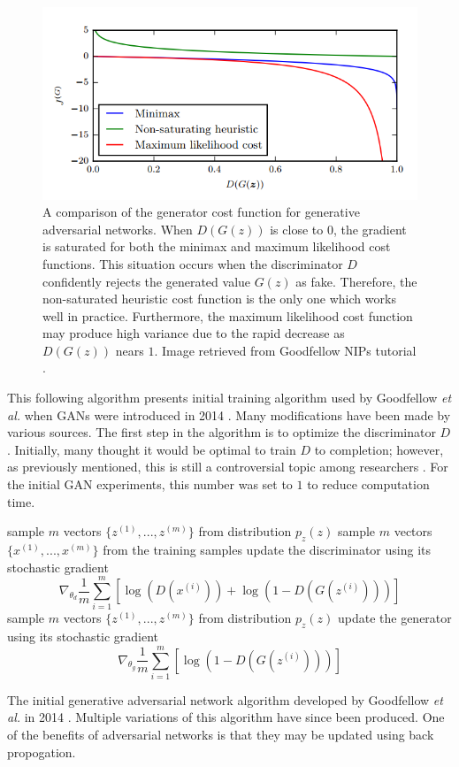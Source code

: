 \documentclass[11pt]{article}
\begin{document}
\begin{figure}
\centering
\includegraphics[scale=0.5]{costfunc}
\caption{A comparison of the generator cost function for generative adversarial networks. When $D(G(z))$ is close to $0$, the gradient is saturated for both the minimax and maximum likelihood cost functions. This situation occurs when the discriminator $D$ confidently rejects the generated value $G(z)$ as fake. Therefore, the non-saturated heuristic cost function is the only one which works well in practice. Furthermore, the maximum likelihood cost function may produce high variance due to the rapid decrease as $D(G(z))$ nears $1$. Image retrieved from Goodfellow NIPs tutorial \citep{2017arXiv170100160G}.}
\label{fig:CostFunc}
\end{figure}

This following algorithm presents initial training algorithm used by Goodfellow \textit{et al.} when GANs were introduced in 2014 \citep{2014arXiv1406.2661G}. Many modifications have been made by various sources. The first step in the algorithm is to optimize the discriminator $D$. Initially, many thought it would be optimal to train $D$ to completion; however, as previously mentioned, this is still a controversial topic among researchers \citep{2017arXiv170100160G}. For the initial GAN experiments, this number was set to $1$ to reduce computation time.

\begin{algorithm}[H]
  \SetAlgoLined
   \linebreak
   \linebreak
   {
     {
      sample $m$ vectors $\{z^{(1)},...,z^{(m)}\}$ from distribution $p_z(z)$\;
      sample $m$ vectors $\{x^{(1)},...,x^{(m)}\}$ from the training samples\;
      update the discriminator using its stochastic gradient
      $$\nabla_{\theta_d}\frac{1}{m}\sum_{i=1}^{m}[\log(D(x^{(i)}))+\log(1-D(G(z^{(i)})))]$$
    }
    sample $m$ vectors $\{z^{(1)},...,z^{(m)}\}$ from distribution $p_z(z)$\;
    update the generator using its stochastic gradient\;
    $$\nabla_{\theta_g}\frac{1}{m}\sum_{i=1}^{m}[\log(1-D(G(z^{(i)})))]$$
  }
  \caption{The initial generative adversarial network algorithm developed by Goodfellow \textit{et al.} in 2014 \citep{2014arXiv1406.2661G}. Multiple variations of this algorithm have since been produced. One of the benefits of adversarial networks is that they may be updated using back propogation.}
\end{algorithm}
\end{document}
